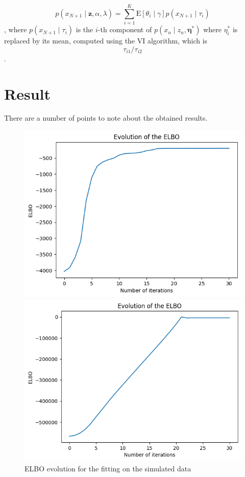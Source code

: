 \documentclass{article}
\begin{document}
$$p\left(x_{N+1} \mid \mathbf{z}, \alpha, \lambda\right)=\sum_{i=1}^K \mathrm{E}\left[\theta_i \mid \gamma\right] p\left(x_{N+1} \mid \tau_i\right)$$, where $p\left(x_{N+1} \mid \tau_i\right)$ is the $i$-th component of $p\left(x_n \mid z_n, \boldsymbol{\eta}^*\right)$ where $\eta_i^*$ is replaced by its mean, computed using the VI algorithm, which is $$\tau_{i1} / \tau_{i2}$$.

\section{Result}

There are a number of points to note about the obtained results.

\begin{figure}[H]
    \begin{minipage}{0.45\textwidth}
        \centering
        \includegraphics[scale=0.3]{images/elbo_sampled.png}
        \caption{ELBO evolution for the fitting on the simulated data}
        \label{fig:elbo_sim}
    \end{minipage}\hfill
    \begin{minipage}{0.45\textwidth}
        \centering
        \includegraphics[scale=0.3]{images/Robot_Elbo.png}

\end{minipage}
\end{figure}
\end{document}
